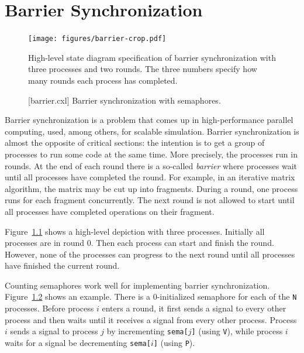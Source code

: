 \documentclass{report}
\newenvironment{code}{
\tcolorbox
}{
\endtcolorbox
}
\begin{document}
\chapter{Barrier Synchronization}
\label{ch:barrier}

\begin{figure}
\begin{center}
\texttt{[image: figures/barrier-crop.pdf]}
\end{center}
\caption{High-level state diagram specification of barrier synchronization
with three processes and two rounds.  The three numbers specify how many
rounds each process has completed.}
\label{fig:barrierdiagram}
\end{figure}

\begin{figure}
\begin{code}
\end{code}
\caption{[barrier.cxl] Barrier synchronization with semaphores.}
\label{fig:barrier}
\end{figure}

Barrier synchronization is a problem that comes up in high-performance
parallel computing, used, among others, for scalable simulation.
Barrier synchronization is almost the opposite of critical sections:
the intention is to get a group of processes to run some code at the
same time.
More precisely, the processes run in rounds.  At the end of each round
there is a so-called \emph{barrier} where processes wait until all
processes have completed the round.
For example, in an iterative matrix algorithm, the matrix may be
cut up into fragments.  During a round, one process runs for each
fragment concurrently.  The next round is not allowed to start
until all processes have completed operations on their fragment.

Figure~\ref{fig:barrierdiagram} shows a high-level depiction with three
processes.  Initially all processes are in round 0.  Then each process
can start and finish the round.  However, none of the processes can
progress to the next round until all processes have finished the
current round.

Counting semaphores work well for implementing barrier synchronization.
Figure~\ref{fig:barrier} shows an example.  There is a 0-initialized
semaphore for each of the \texttt{N} processes.
Before process $i$ enters a round, it first sends a signal to every
other process and then waits until it receives a signal from
every other process.  Process $i$ sends a signal to process $j$
by incrementing \texttt{sema[$j$]} (using \texttt{V}),
while process $i$ waits for a signal be decrementing \texttt{sema[$i$]}
(using \texttt{P}).
\end{document}
